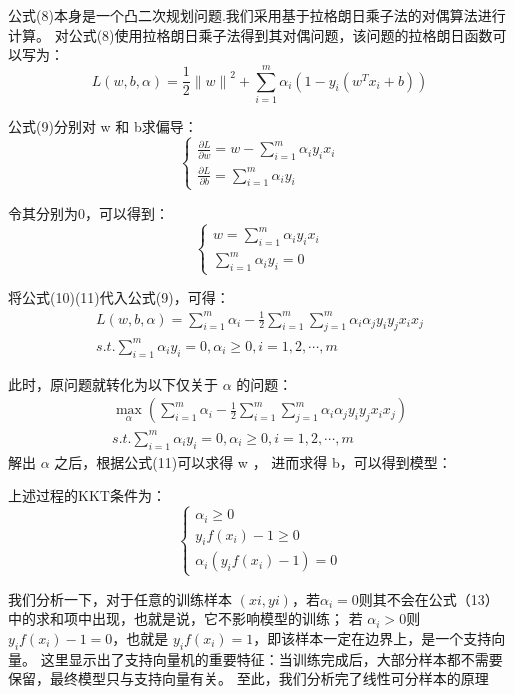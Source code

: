 \documentclass[UTF8]{article}
\begin{document}
{公式(8)本身是一个凸二次规划问题.我们采用基于拉格朗日乘子法的对偶算法进行计算。
对公式(8)使用拉格朗日乘子法得到其对偶问题，该问题的拉格朗日函数可以写为：
\begin{equation}
	L(w,b,\alpha)=\frac{1}{2}{\lVert w\rVert}^2+\sum\limits_{i=1}^m\alpha_i(1-y_i(w^T x_i+b))
\end{equation}

公式(9)分别对 w 和 b求偏导：
\begin{equation}
	\left\{
	\begin{array}{lcl}
	\frac{\partial L}{\partial w}=w-\sum\limits_{i=1}^m\alpha_i y_i x_i\\
	\frac{\partial L}{\partial b}=\sum\limits_{i=1}^m\alpha_i y_i
	\end{array}
	\right.
\end{equation}

令其分别为0，可以得到：
\begin{equation}
\left\{
\begin{array}{lcl}
\label{eqn9}
w=\sum\limits_{i=1}^m\alpha_i y_i x_i\\
\sum\limits_{i=1}^m\alpha_i y_i=0
\end{array}
\right.
\end{equation}

将公式(10)(11)代入公式(9)，可得：
\begin{equation}
\begin{split}
	L(w,b,\alpha)=\sum\limits_{i=1}^m\alpha_i-\frac{1}{2}\sum\limits_{i=1}^m\sum\limits_{j=1}^m\alpha_i\alpha_j y_i y_j x_i x_j\\
	s.t.\sum\limits_{i=1}^m\alpha_i y_i= 0,\alpha_i\ge 0,i = 1,2,\cdots,m
\end{split}
\end{equation}

此时，原问题就转化为以下仅关于 $\alpha $ 的问题：
\begin{equation}
\begin{split}
\max\limits_{\alpha}\left(\sum\limits_{i=1}^m\alpha_i-\frac{1}{2}\sum\limits_{i=1}^m\sum\limits_{j=1}^m\alpha_i\alpha_j y_i y_j x_i x_j\right)\\
s.t.\sum\limits_{i=1}^m\alpha_i y_i= 0,\alpha_i\ge 0,i = 1,2,\cdots,m
\end{split}
\end{equation}
解出 $\alpha $ 之后，根据公式(11)可以求得 w ， 进而求得 b，可以得到模型：

上述过程的KKT条件为：
\begin{equation}
	\left\{
	\begin{array}{lcl}
	\alpha_i\ge0\\
	y_if(x_i)-1\ge0\\
	\alpha_i(y_if(x_i)-1) = 0
	\end{array}
	\right.
\end{equation}

我们分析一下，对于任意的训练样本 $(xi,yi)$，若$\alpha_i = 0$则其不会在公式（13）中的求和项中出现，也就是说，它不影响模型的训练；
若 $\alpha_i > 0$则$ y_if(x_i)−1=0$，也就是 $y_if(x_i)=1$，即该样本一定在边界上，是一个支持向量。
这里显示出了支持向量机的重要特征：当训练完成后，大部分样本都不需要保留，最终模型只与支持向量有关。
至此，我们分析完了线性可分样本的原理}\\
\end{document}

